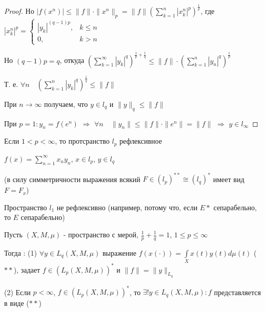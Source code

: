 \documentclass[a4paper,12pt]{report}
\begin{document}
\begin{proof}
Но $|f(x^n)|\le\|f\|\cdot\|x^n\|_p=\|f\|\left(\sum\limits_{k=1}^n|x_k^n|^p\right)^{\frac1p}$, где $|x_k^n|^p=\begin{cases}|y_k|^{(q-1)p},&k\le n\\0,&k>n\end{cases}$

Но $(q-1)p=q$, откуда $\left(\sum\limits_{k=1}^\infty|y_k|^q\right)^{\frac1p+\frac1q}\le\|f\|\cdot\left(\sum\limits_{k=1}^n|y_n|^q\right)^{\frac1p}$

Т. е. $\forall n\quad\left(\sum\limits_{k=1}^n|y_k|^q\right)^{\frac1q}\le\|f\|$

При $n\to\infty$ получаем, что $y\in l_q$ и $\|y\|_q\le\|f\|$

При $p=1\colon y_n=f(e^n)$ $\Rightarrow$ $\forall n\quad\|y_n\|\le\|f\|\cdot\|e^n\|=\|f\|$ $\Rightarrow$ $y\in l_\infty$
\end{proof}
 


\begin{cons}
Если $1<p<\infty$, то протсранство $l_p$ рефлексивное

$f(x)=\sum\limits_{n=1}^\infty x_n y_n$, $x\in l_p$, $y\in l_q$

(в силу симметричности выражения всякий $F\in (l_p)^{**}\cong(l_q)^*$ имеет вид $F=F_x$)
\end{cons}
 


\begin{rem}
Пространство $l_1$ не рефлексивно (например, потому что, если $E*$ сепарабельно, то $E$ сепарабельно)
\end{rem}
 


\begin{thm}
Пусть $(X,M,\mu)$ - пространство с мерой, $\frac1p+\frac1q=1$, $1\le p\le\infty$ 

Тогда : (1) $\forall y\in L_q(X,M,\mu)$ выражение $f(x(\cdot))=\displaystyle\int\limits_X x(t)y(t)d\mu(t)$ ($**$), задает $f\in\left(L_p(X,M,\mu)\right)^*$ и $\|f\|=\|y\|_{L_q}$

(2) Если $p<\infty$, $f\in\left(L_p(X,M,\mu)\right)^*$, то $\exists!y\in L_q(X,M,\mu)\colon f$ представляется в виде ($**$)
\end{thm}
 
\end{document}
